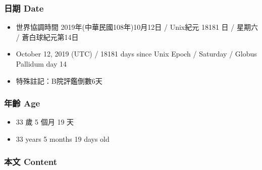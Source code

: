 \documentclass[a5paper, 12pt
]{book}
\providecommand{\tightlist}{%
  \setlength{\itemsep}{0pt}\setlength{\parskip}{0pt}}
\begin{document}
\hypertarget{ux65e5ux671f-date-13}{%
\subsubsection{日期 Date}\label{ux65e5ux671f-date-13}}

\begin{itemize}
\tightlist
\item
  世界協調時間 2019年(中華民國108年)10月12日 / Unix紀元 18181 日 /
  星期六 / 蒼白球紀元第14日
\item
  October 12, 2019 (UTC) / 18181 days since Unix Epoch / Saturday /
  Globus Pallidum day 14
\item
  特殊註記：B院評鑑倒數6天
\end{itemize}

\hypertarget{ux5e74ux9f61-age-13}{%
\subsubsection{年齡 Age}\label{ux5e74ux9f61-age-13}}

\begin{itemize}
\tightlist
\item
  33 歲 5 個月 19 天
\item
  33 years 5 months 19 days old
\end{itemize}

\hypertarget{ux672cux6587-content-13}{%
\subsubsection{本文 Content}\label{ux672cux6587-content-13}}
\end{document}
